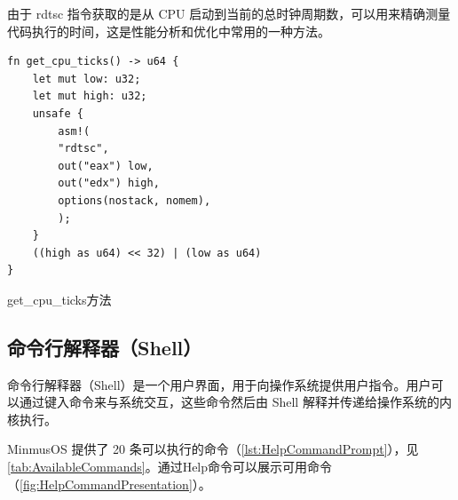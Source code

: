 由于 rdtsc 指令获取的是从 CPU 启动到当前的总时钟周期数，可以用来精确测量代码执行的时间，这是性能分析和优化中常用的一种方法。

\begin{listing}[htbp]
    \begin{verbatim}
fn get_cpu_ticks() -> u64 {
    let mut low: u32;
    let mut high: u32;
    unsafe {
        asm!(
        "rdtsc",
        out("eax") low,
        out("edx") high,
        options(nostack, nomem),
        );
    }
    ((high as u64) << 32) | (low as u64)
}
    \end{verbatim}
    \caption{get\_cpu\_ticks方法}\label{lst:GetCpuTicksMethod}
\end{listing}

\subsection{命令行解释器（Shell）}

命令行解释器（Shell）是一个用户界面，用于向操作系统提供用户指令。用户可以通过键入命令来与系统交互，这些命令然后由 Shell 解释并传递给操作系统的内核执行。

MinmusOS 提供了 20 条可以执行的命令（\cref{lst:HelpCommandPrompt}），见\cref{tab:AvailableCommands}。通过Help命令可以展示可用命令（\cref{fig:HelpCommandPresentation}）。

